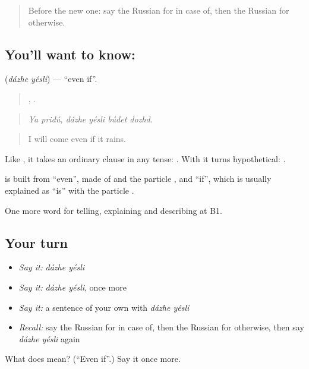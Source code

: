 \label{lesson:RU-C370-dazhe-esli}



\begin{quote}
Before the new one: say the Russian for in case of, then the Russian for otherwise.
\end{quote}

\subsection*{You'll want to know:  }
\textbf{ } (\emph{dázhe yésli}) — \textquotedblleft{}even if\textquotedblright{}.

\begin{quote}
 ,    .
\end{quote}

\begin{quote}
\emph{Ya pridú, dázhe yésli búdet dozhd.}
\end{quote}

\begin{quote}
I will come even if it rains.
\end{quote}

Like \emph{}, it takes an ordinary clause in any tense: \emph{   }. With \emph{} it turns hypothetical: \emph{    }.

\begin{cousinweb}
\textbf{ } is built from \emph{} \textquotedblleft{}even\textquotedblright{}, made of \emph{} and the particle \emph{}, and \emph{} \textquotedblleft{}if\textquotedblright{}, which is usually explained as \emph{} \textquotedblleft{}is\textquotedblright{} with the particle \emph{}.
\end{cousinweb}

\begin{grammarlens}[title={What you've built}]
One more word for telling, explaining and describing at B1.
\end{grammarlens}

\subsection*{Your turn}
\begin{itemize}
\raggedright
  \item \emph{Say it:} \emph{dázhe yésli}
  \item \emph{Say it:} \emph{dázhe yésli}, once more
  \item \emph{Say it:} a sentence of your own with \emph{dázhe yésli}
  \item \emph{Recall:} say the Russian for in case of, then the Russian for otherwise, then say \emph{dázhe yésli} again
\end{itemize}

\begin{tcolorbox}[breakable,colback=teal!4,colframe=teal!35!black,title={Before you move on}]
What does   mean? (\textquotedblleft{}Even if\textquotedblright{}.) Say it once more.
\end{tcolorbox}
